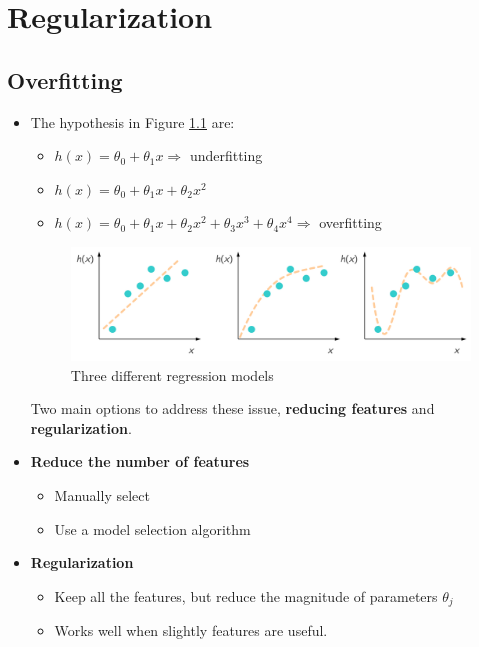 \chapter{Regularization}


\section{Overfitting}
\begin{itemize}
    \item The hypothesis in Figure \ref{fig:overfitting} are:
        \begin{itemize}
            \item $h(x) = \theta_0 + \theta_1x \Rightarrow$ underfitting
            \item $h(x) = \theta_0 + \theta_1x + \theta_2x^2$
            \item $h(x) = \theta_0 + \theta_1x + \theta_2x^2 + \theta_3x^3 + \theta_4x^4 \Rightarrow$ overfitting
        \end{itemize}
    \begin{figure}[!htbp]\label{fig:overfitting}
        \centering
        \includegraphics[width=5.4in]{./images/overfitting.png}
        \caption{Three different regression models}
    \end{figure}
    Two main options to address these issue, \textbf{reducing features} and \textbf{regularization}.
    
    \item \textbf{Reduce the number of features}
        \begin{itemize}
            \item Manually select
            \item Use a model selection algorithm
        \end{itemize}
    \item \textbf{Regularization}
        \begin{itemize}
            \item Keep all the features, but reduce the magnitude of parameters $\theta_j$
            \item Works well when slightly features are useful.
        \end{itemize}
\end{itemize}


